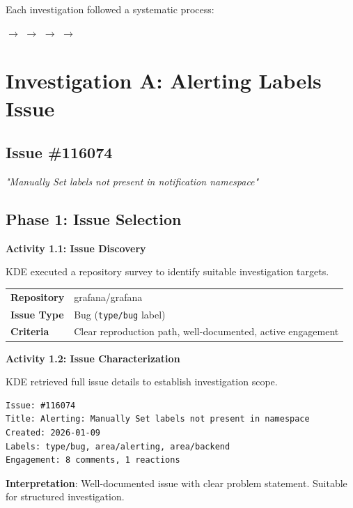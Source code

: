 \documentclass[
    11pt,
    a4paper,
    oneside,
    parskip=full,
    headings=big,
    bibliography=totoc
]{scrartcl}
\newcommand{\code}[1]{\texttt{#1}}
\begin{document}
Each investigation followed a systematic process:
\begin{center}
 $\rightarrow$
 $\rightarrow$
 $\rightarrow$
 $\rightarrow$
\end{center}

\newpage
\section{Investigation A: Alerting Labels Issue}

\subsection{Issue \#116074}

{\itshape\color{black70}"Manually Set labels not present in notification namespace"}

\subsection*{Phase 1: Issue Selection}

\begin{actionbox}
    \textbf{Activity 1.1: Issue Discovery}
    
    KDE executed a repository survey to identify suitable investigation targets.
    
    \vspace{0.3cm}
    \begin{tabular}{p{3cm}p{10cm}}
        \textbf{Repository} & grafana/grafana \\
        \textbf{Issue Type} & Bug (\code{type/bug} label) \\
        \textbf{Criteria} & Clear reproduction path, well-documented, active engagement \\
    \end{tabular}
\end{actionbox}

\begin{actionbox}
    \textbf{Activity 1.2: Issue Characterization}
    
    KDE retrieved full issue details to establish investigation scope.
    
    \vspace{0.3cm}
    \begin{evidencebox}
    \begin{verbatim}
Issue: #116074
Title: Alerting: Manually Set labels not present in namespace
Created: 2026-01-09
Labels: type/bug, area/alerting, area/backend
Engagement: 8 comments, 1 reactions
    \end{verbatim}
    \end{evidencebox}
    
    \vspace{0.3cm}
    \textbf{Interpretation}: Well-documented issue with clear problem statement. 
    Suitable for structured investigation.
\end{actionbox}
\end{document}
